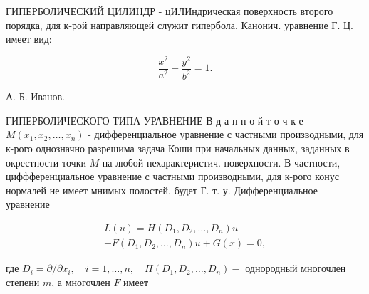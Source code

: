 \documentclass[10pt]{article}
\begin{document}
ГИПЕРБОЛИЧЕСКИЙ ЦИЛИНДР - цИЛИндрическая поверхность второго порядка, для к-рой направляющей служит гипербола. Канонич. уравнение Г. Ц. имеет вид:



\[

\frac{x^{2}}{a^{2}}-\frac{y^{2}}{b^{2}}=1 .

\]



А. Б. Иванов.



ГИПЕРБОЛИЧЕСКОГО ТИПА УРАВНЕНИЕ В д а н н о й т о ч к е $M\left(x_{1}, x_{2}, \ldots, x_{n}\right)$ - дифференциальное уравнение с частными производными, для к-рого однозначно разрешима задача Коши при начальных данных, заданных в окрестности точки $M$ на любой нехарактеристич. поверхности. В частности, циффференциальное уравнение с частными производными, для к-рого конус нормалей не имеет мнимых полостей, будет Г. т. у. Дифференциальное уравнение



\[

\begin{gathered}

L(u)=H\left(D_{1}, D_{2}, \ldots, D_{n}\right) u+ \\

+F\left(D_{1}, D_{2}, \ldots, D_{n}\right) u+G(x)=0,

\end{gathered}

\]



где $D_{i}=\partial / \partial x_{i}, \quad i=1, \ldots, n, \quad H\left(D_{1}, D_{2}, \ldots, D_{n}\right)-$ однородный многочлен степени $m$, а многочлен $F$ имеет
\end{document}
